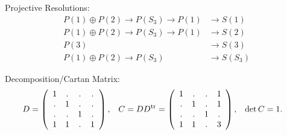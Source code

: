 \documentclass[12pt,a4paper]{amsart}
\begin{document}
Projective Resolutions:
\begin{align*}
P(1) \oplus P(2) \to P(S_3) \to P(1)  & \to S(1) \\
P(1) \oplus P(2) \to P(S_3) \to P(1)  & \to S(2) \\
P(3) & \to S(3) \\
P(1) \oplus P(2) \to P(S_3) & \to S(S_3)
\end{align*}

Decomposition/Cartan Matrix:
\begin{align*}
  D &= \left(
  \begin{array}{cccc}
    1&.&.&.\\
    .&1&.&.\\
    .&.&1&.\\
    1&1&.&1
  \end{array}
  \right)\text,&
C = D D^{\mathrm{tr}} &= \left(
  \begin{array}{cccc}
    1&.&.&1\\
    .&1&.&1\\
    .&.&1&.\\
    1&1&.&3
  \end{array}
  \right)\text,&
\det C &= 1\text.
\end{align*}
\end{document}
